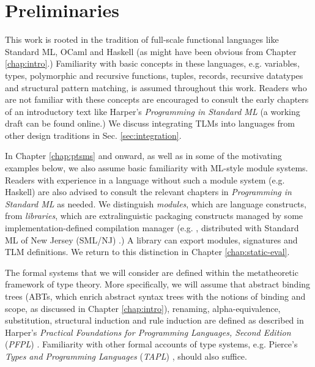 
\section{Preliminaries}\label{sec:preliminaries}
\vspace{-3px}
This work is rooted in the tradition of full-scale functional languages like Standard ML, OCaml and Haskell (as might have been obvious from Chapter \ref{chap:intro}.) Familiarity with basic concepts in these languages, e.g. variables, types, polymorphic and recursive functions, tuples, records, recursive datatypes and structural pattern matching, is assumed throughout this work. Readers who are not familiar with these concepts are encouraged to consult the early chapters of an introductory text like Harper's \emph{Programming in Standard ML} \cite{harper1997programming} (a working draft can be found online.) We discuss integrating TLMs into languages from other design traditions in Sec. \ref{sec:integration}.

In Chapter \ref{chap:ptsms} and onward, as well as in some of the motivating examples below, we also assume basic familiarity with ML-style module systems. Readers with experience in a language without such a module system (e.g. Haskell) are also advised to consult the relevant chapters in \emph{Programming in Standard ML} \cite{harper1997programming} as needed. We distinguish \emph{modules}, which are language constructs, from \emph{libraries}, which are extralinguistic packaging constructs managed by some implementation-defined compilation manager (e.g. , distributed with Standard ML of New Jersey (SML/NJ) \cite{DBLP:conf/plilp/AppelM91}.) A library can export modules, signatures and TLM definitions. We return to this distinction in Chapter \ref{chap:static-eval}.

The formal systems that we will consider are defined within the metatheoretic framework of type theory. More specifically, we will assume that abstract binding trees (ABTs, which enrich abstract syntax trees with the notions of binding and scope, as discussed in Chapter \ref{chap:intro}), renaming, alpha-equivalence, substitution, structural induction and rule induction are defined as described in Harper's \emph{Practical Foundations for Programming Languages, Second Edition} (\emph{PFPL}) \cite{pfpl}. Familiarity with other formal accounts of type systems, e.g. Pierce's \emph{Types and Programming Languages} (\emph{TAPL}) \cite{tapl}, should also suffice.%

